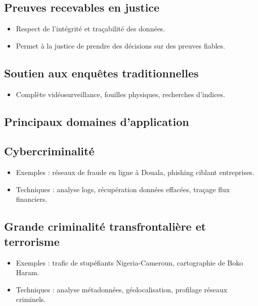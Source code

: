 \documentclass[12pt]{article}
\begin{document}
\begin{center}
\subsection{ Preuves recevables en justice}
\begin{itemize}[leftmargin=*, label=\textbullet]
    \item Respect de l’intégrité et traçabilité des données.
    \item Permet à la justice de prendre des décisions sur des preuves fiables.
\end{itemize}

\subsection{Soutien aux enquêtes traditionnelles}
\begin{itemize}[leftmargin=*, label=\textbullet]
    \item Complète vidéosurveillance, fouilles physiques, recherches d’indices.
\end{itemize}

\subsection*{ Principaux domaines d’application}

\subsection{ Cybercriminalité}
\begin{itemize}[leftmargin=*, label=\textbullet]
    \item Exemples : réseaux de fraude en ligne à Douala, phishing ciblant entreprises.
    \item Techniques : analyse logs, récupération données effacées, traçage flux financiers.
\end{itemize}

\subsection{Grande criminalité transfrontalière et terrorisme}
\begin{itemize}[leftmargin=*, label=\textbullet]
    \item Exemples : trafic de stupéfiants Nigeria-Cameroun, cartographie de Boko Haram.
    \item Techniques : analyse métadonnées, géolocalisation, profilage réseaux criminels.
\end{itemize}


\end{center}
\end{document}

